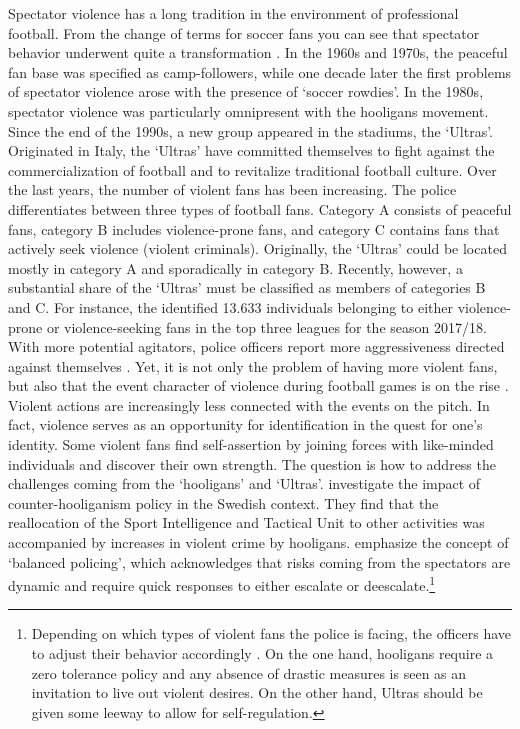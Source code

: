 \documentclass[11pt, a4paper]{article} %
\begin{document}
Spectator violence has a long tradition in the environment of professional football. From the change of terms for soccer fans you can see that spectator behavior underwent quite a transformation \citep{pilz2005kuttenfan}. In the 1960s and 1970s, the peaceful fan base was specified as camp-followers, while one decade later the first problems of spectator violence arose with the presence of `soccer rowdies'. In the 1980s, spectator violence was particularly omnipresent with the hooligans movement. Since the end of the 1990s, a new group appeared in the stadiums, the `Ultras'. Originated in Italy, the `Ultras' have committed themselves to fight against the commercialization of football and to revitalize traditional football culture. Over the last years, the number of violent fans has been increasing. The police differentiates between three types of football fans. Category A consists of peaceful fans, category B includes violence-prone fans, and category C contains fans that actively seek violence (violent criminals). Originally, the `Ultras' could be located mostly in category A and sporadically in category B. Recently, however, a substantial share of the `Ultras' must be classified as members of categories B and C. For instance, the \cite{zis17_18} identified 13.633 individuals belonging to either violence-prone or violence-seeking fans in the top three leagues for the season 2017/18. With more potential agitators, police officers report more aggressiveness directed against themselves \citep{feltes2010fussballgewalt}. Yet, it is not only the problem of having more violent fans, but also that the event character of violence during football games is on the rise \citep{pilz2005kuttenfan}. Violent actions are increasingly less connected with the events on the pitch. In fact, violence serves as an opportunity for identification in the quest for one's identity. Some violent fans find self-assertion by joining forces with like-minded individuals and discover their own strength. The question is how to address the challenges coming from the `hooligans' and `Ultras'. \cite{poutvaara2009police} investigate the impact of counter-hooliganism policy in the Swedish context. They find that the reallocation of the Sport Intelligence and Tactical Unit to other activities was accompanied by increases in violent crime by hooligans. \cite{feltes2010fussballgewalt} emphasize the concept of `balanced policing', which acknowledges that risks coming from the spectators are dynamic and require quick responses to either escalate or deescalate.\footnote{Depending on which types of violent fans the police is facing, the officers have to adjust their behavior accordingly \citep{feltes2010fussballgewalt}. On the one hand, hooligans require a zero tolerance policy and any absence of drastic measures is seen as an invitation to live out violent desires. On the other hand, Ultras should be given some leeway to allow for self-regulation.} 
\end{document}
